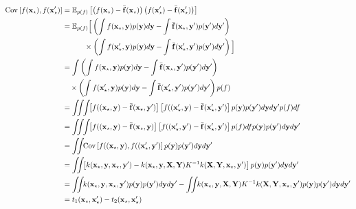 \begin{align}
\covarianceargs{}{f(\vx\st), f(\vx\st')} & = \expectargs{p(f)}{ \left( f(\vx\st) - \mf(\vx\st) \right)\left( f(\vx\st') - \mf(\vx\st') \right)}\\
 & = \expect_{p(f)} \Big[ \left( \int f(\vx\st, \vy) p(\vy) d\vy - \int \mf(\vx\st, \vy') p(\vy') d\vy' \right) \\
   & \qquad \quad \times \left( \int f(\vx\st', \vy) p(\vy) d\vy - \int \mf(\vx\st', \vy') p(\vy') d\vy' \right) \Big]\\
 & = \int \left( \int f(\vx\st, \vy) p(\vy) d\vy - \int \mf(\vx\st, \vy') p(\vy') d\vy' \right) \\
   & \quad \times \left( \int f(\vx\st', \vy) p(\vy) d\vy - \int \mf(\vx\st', \vy') p(\vy') d\vy' \right) p(f) \\
& = \int\!\!\! \int\!\! \int\!\! \left[ f((\vx\st, \vy) - \mf(\vx\st, \vy') \right]  \left[ f((\vx\st', \vy) - \mf(\vx\st', \vy') \right] p(\vy) p(\vy') d\vy d\vy' p(f) df \\
& = \int\!\!\! \int\!\! \int\!\! \left[ f((\vx\st, \vy) - \mf(\vx\st, \vy) \right]  \left[ f((\vx\st', \vy') - \mf(\vx\st', \vy') \right] p(f) df p(\vy) p(\vy') d\vy d\vy' \\
& = \int\!\! \!\int\!\! \Cov \left[ f((\vx\st, \vy), f((\vx\st', \vy') \right] p(\vy) p(\vy') d\vy d\vy' \\
& = \int\!\!\! \int\!\! \left[ k(\vx\st, \vy, \vx\st, \vy') - k(\vx\st, \vy, \vX, \vY) K^{-1} k(\vX, \vY, \vx\st, \vy') \right] p(\vy) p(\vy') d\vy d\vy' \\
& = \int\!\!\! \int\!\! k(\vx\st, \vy, \vx\st, \vy') p(\vy) p(\vy') d\vy d\vy' - \int\!\!\! \int\!\! k(\vx\st, \vy, \vX, \vY) K^{-1} k(\vX, \vY, \vx\st, \vy') p(\vy) p(\vy') d\vy d\vy' \\
& = t_1(\vx\st, \vx\st') - t_2(\vx\st, \vx\st')
\label{eq:marg_var_symbolic}
\end{align} 
